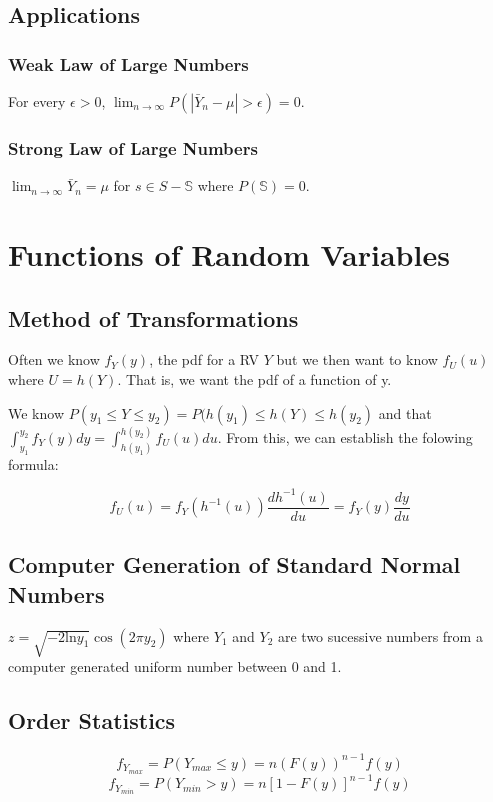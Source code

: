 \documentclass{article}
\begin{document}
\subsection{Applications}
\subsubsection{Weak Law of Large Numbers}
For every $\epsilon > 0$,
$\lim_{n \to \infty} P(|\bar{Y}_n - \mu| > \epsilon) = 0$.
\subsubsection{Strong Law of Large Numbers}
$\lim_{n \to \infty} \bar{Y}_n = \mu$ for $s \in S - \mathbb{S}$ where
$P(\mathbb{S}) = 0$.

\section{Functions of Random Variables}
\subsection{Method of Transformations}
Often we know $f_Y(y)$, the pdf for a RV $Y$ but we then want to know $f_U(u)$
where $U=h(Y)$. That is, we want the pdf of a function of y.

We know $P(y_1 \leq Y \leq y_2) = P(h(y_1) \leq h(Y) \leq h(y_2)$ and that
$\int_{y_1}^{y_2}f_Y(y)dy=\int_{h(y_1)}^{h(y_2)}f_U(u)du$. From this, we can
establish the folowing formula:

\[f_U(u) = f_Y(h^{-1}(u)) \frac{dh^{-1}(u)}{du} = f_Y(y)\frac{dy}{du}\]
\subsection{Computer Generation of Standard Normal Numbers}

$z=\sqrt{-2\text{ln}y_1}\cos(2\pi y_2)$ where $Y_1$ and $Y_2$ are two sucessive
numbers from a computer generated uniform number between 0 and 1.
\subsection{Order Statistics}
\[f_{Y_{max}} = P(Y_{max} \leq y) = n(F(y))^{n-1}f(y)\]
\[f_{Y_{min}} = P(Y_{min} > y) = n[1-F(y)]^{n-1}f(y)\]
\end{document}
